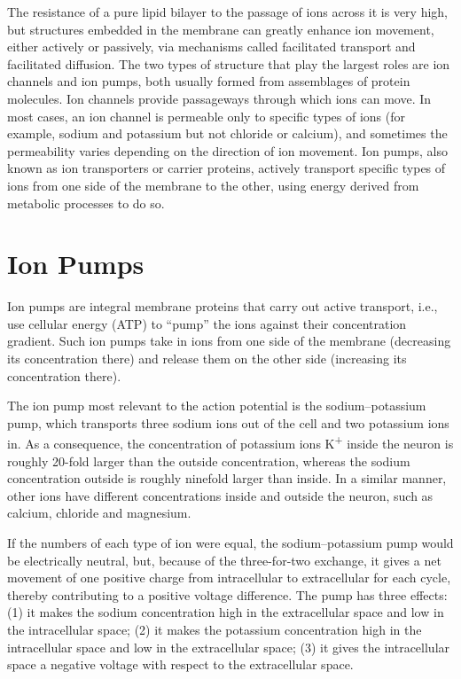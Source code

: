 The resistance of a pure lipid bilayer to the passage of ions across it is very high, but structures embedded in the membrane can greatly enhance ion movement, either actively or passively, via mechanisms called facilitated transport and facilitated diffusion. The two types of structure that play the largest roles are ion channels and ion pumps, both usually formed from assemblages of protein molecules. Ion channels provide passageways through which ions can move. In most cases, an ion channel is permeable only to specific types of ions (for example, sodium and potassium but not chloride or calcium), and sometimes the permeability varies depending on the direction of ion movement. Ion pumps, also known as ion transporters or carrier proteins, actively transport specific types of ions from one side of the membrane to the other, using energy derived from metabolic processes to do so.

\hypertarget{ion-pumps}{%
\section{Ion Pumps}\label{ion-pumps}}

Ion pumps are integral membrane proteins that carry out active transport, i.e., use cellular energy (ATP) to ``pump'' the ions against their concentration gradient. Such ion pumps take in ions from one side of the membrane (decreasing its concentration there) and release them on the other side (increasing its concentration there).

The ion pump most relevant to the action potential is the sodium--potassium pump, which transports three sodium ions out of the cell and two potassium ions in. As a consequence, the concentration of potassium ions K\textsuperscript{+} inside the neuron is roughly 20-fold larger than the outside concentration, whereas the sodium concentration outside is roughly ninefold larger than inside. In a similar manner, other ions have different concentrations inside and outside the neuron, such as calcium, chloride and magnesium.

If the numbers of each type of ion were equal, the sodium--potassium pump would be electrically neutral, but, because of the three-for-two exchange, it gives a net movement of one positive charge from intracellular to extracellular for each cycle, thereby contributing to a positive voltage difference. The pump has three effects: (1) it makes the sodium concentration high in the extracellular space and low in the intracellular space; (2) it makes the potassium concentration high in the intracellular space and low in the extracellular space; (3) it gives the intracellular space a negative voltage with respect to the extracellular space.

